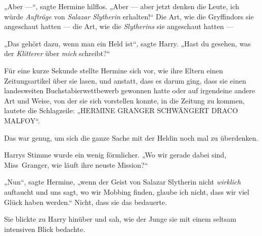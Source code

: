 „Aber —“, sagte Hermine hilflos.
„Aber — aber jetzt denken die Leute, ich würde \emph{Aufträge} von \emph{Salazar Slytherin} erhalten!“ Die Art, wie die Gryffindors sie angeschaut hatten — die Art, wie die \emph{Slytherins} sie angeschaut hatten —

„Das gehört dazu, wenn man ein Held ist“, sagte Harry.
„Hast du gesehen, was der \emph{Klitterer} über \emph{mich} schreibt?“

Für eine kurze Sekunde stellte Hermine sich vor, wie ihre Eltern einen Zeitungsartikel über sie lasen, und anstatt, dass es darum ging, dass sie einen landesweiten Buchstabierwettbewerb gewonnen hatte oder auf irgendeine andere Art und Weise, von der sie sich vorstellen konnte, in die Zeitung zu kommen, lautete die Schlagzeile:
„HERMINE GRANGER SCHWÄNGERT DRACO MALFOY“.

Das war genug, um sich die ganze Sache mit der Heldin noch mal zu überdenken.

Harrys Stimme wurde ein wenig förmlicher.
„Wo wir gerade dabei sind, Miss~Granger, wie läuft ihre neuste Mission?“

„Nun“, sagte Hermine, „wenn der Geist von Salazar Slytherin nicht \emph{wirklich} auftaucht und uns sagt, wo wir Mobbing finden, glaube ich nicht, dass wir viel Glück haben werden.“ Nicht, dass sie das bedauerte.

Sie blickte zu Harry hinüber und sah, wie der Junge sie mit einem seltsam intensiven Blick bedachte.

